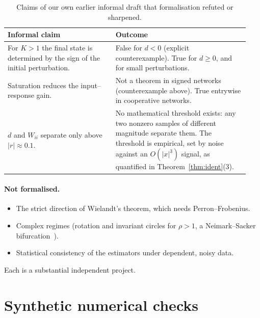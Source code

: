 \documentclass[11pt]{article}
\theoremstyle{definition}
\theoremstyle{remark}
\begin{document}
\begin{table}[h]
\centering
\caption{Claims of our own earlier informal draft that formalisation refuted or sharpened.}\label{tab:corrections}
\begin{tabular}{@{}p{0.42\linewidth}p{0.52\linewidth}@{}}
\toprule
Informal claim & Outcome \\
\midrule
For $K>1$ the final state is determined by the sign of the initial perturbation. & False for $d<0$
(explicit counterexample). True for $d\ge0$, and for small perturbations. \\ \addlinespace
Saturation reduces the input--response gain. & Not a theorem in signed networks
(counterexample above). True entrywise in cooperative networks. \\ \addlinespace
$d$ and $W_{ii}$ separate only above $|r|\approx0.1$. & No mathematical threshold exists: any two nonzero
samples of different magnitude separate them. The threshold is empirical, set by noise against an
$O(|x|^3)$ signal, as quantified in Theorem~\ref{thm:ident}(3). \\
\bottomrule
\end{tabular}
\end{table}

\paragraph{Not formalised.}
\begin{itemize}
\item The strict direction of Wielandt's theorem, which needs Perron--Frobenius.
\item Complex regimes (rotation and invariant circles for $\rho>1$, a Neimark--Sacker
      bifurcation~\cite{kuznetsov}).
\item Statistical consistency of the estimators under dependent, noisy data.
\end{itemize}
Each is a substantial independent project.

\section{Synthetic numerical checks}\label{sec:numerics}
\end{document}
